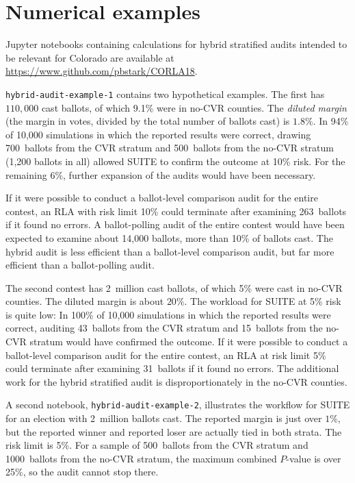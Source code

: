 \documentclass[runningheads]{llncs}
\begin{document}
\section{Numerical examples}\label{sec:examples}

Jupyter notebooks containing calculations for hybrid stratified audits intended to be relevant for Colorado are available at \url{https://www.github.com/pbstark/CORLA18}.

\texttt{hybrid-audit-example-1} contains two hypothetical examples. 
The first has $110,000$ cast ballots, of which 
9.1\% were in no-CVR counties. 
The \emph{diluted margin} (the margin in votes, divided by the total number of ballots cast) is $1.8\%$.
In 94\% of 10,000 simulations in which
the reported results were correct, drawing 700~ballots from the CVR stratum and 500~ballots 
from the no-CVR stratum (1,200 ballots in all)
allowed SUITE to confirm the outcome at 10\% risk.
For the remaining 6\%, further expansion of the audits would have been necessary.

If it were possible to conduct a ballot-level comparison audit for the entire contest, 
an RLA with risk limit 10\% could terminate after examining 263~ballots if it found no errors.
A ballot-polling audit of the entire contest would have been expected to examine about 14,000 ballots, more than 10\% of ballots cast.
The hybrid audit is less efficient than a ballot-level comparison audit, but far more efficient than a ballot-polling audit.

The second contest has 2~million cast ballots, of which 5\% were cast in no-CVR counties.
The diluted margin is about $20\%$.
The workload for SUITE at 5\% risk is quite low:
In 100\% of 10,000 simulations in which
the reported results were correct, auditing 43~ballots from the 
CVR stratum and 15~ballots from the no-CVR stratum
would have confirmed the outcome.
If it were possible to conduct a ballot-level comparison audit for the entire contest, 
an RLA at risk limit 5\% could terminate after examining 31~ballots if it found no errors.
The additional work for the hybrid stratified audit is disproportionately in the no-CVR counties.

A second notebook, \texttt{hybrid-audit-example-2}, illustrates the 
workflow for SUITE for an election with 2~million ballots cast.
The reported margin is just over $1\%$, but the reported winner
and reported loser are actually tied in both strata.  
The risk limit is 5\%.
For a sample of 500~ballots from the CVR stratum and 1000~ballots from the no-CVR stratum, 
the maximum combined $P$-value is over 25\%, so the audit cannot stop there.
\end{document}
